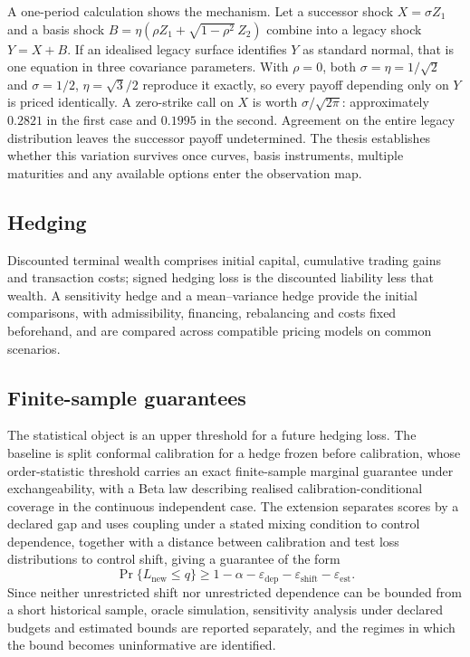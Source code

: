 \documentclass[12pt,final]{article}
\begin{document}
	A one-period calculation shows the mechanism. Let a successor shock
	$X = \sigma Z_1$ and a basis shock
	$B = \eta(\rho Z_1 + \sqrt{1-\rho^2}\,Z_2)$ combine into a legacy shock
	$Y = X + B$. If an idealised legacy surface identifies $Y$ as standard
	normal, that is one equation in three covariance parameters. With $\rho = 0$,
	both $\sigma = \eta = 1/\sqrt{2}$ and $\sigma = 1/2$, $\eta = \sqrt{3}/2$
	reproduce it exactly, so every payoff depending only on $Y$ is priced
	identically. A zero-strike call on $X$ is worth $\sigma/\sqrt{2\pi}$:
	approximately $0.2821$ in the first case and $0.1995$ in the second.
	Agreement on the entire legacy distribution leaves the successor payoff
	undetermined. The thesis establishes whether this variation survives once
	curves, basis instruments, multiple maturities and any available options
	enter the observation map.

	\subsection{Hedging}

	Discounted terminal wealth comprises initial capital, cumulative trading gains
	and transaction costs; signed hedging loss is the discounted liability less
	that wealth. A sensitivity hedge and a mean--variance hedge provide the
	initial comparisons, with admissibility, financing, rebalancing and costs
	fixed beforehand, and are compared across compatible pricing models on common
	scenarios.

	\subsection{Finite-sample guarantees}

	The statistical object is an upper threshold for a future hedging loss. The
	baseline is split conformal calibration for a hedge frozen before
	calibration, whose order-statistic threshold carries an exact finite-sample
	marginal guarantee under exchangeability, with a Beta law describing realised
	calibration-conditional coverage in the continuous independent case. The
	extension separates scores by a declared gap and uses coupling under a stated
	mixing condition to control dependence, together with a distance between
	calibration and test loss distributions to control shift, giving a guarantee
	of the form
	\begin{equation}
		\Pr\{L_{\mathrm{new}} \leq q\} \geq 1 - \alpha - \varepsilon_{\mathrm{dep}} - \varepsilon_{\mathrm{shift}} - \varepsilon_{\mathrm{est}}.
	\end{equation}
	Since neither unrestricted shift nor unrestricted dependence can be bounded
	from a short historical sample, oracle simulation, sensitivity analysis under
	declared budgets and estimated bounds are reported separately, and the
	regimes in which the bound becomes uninformative are identified.
\end{document}
